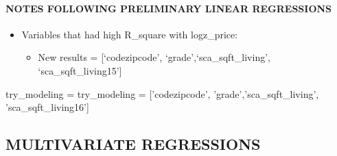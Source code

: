 \documentclass[11pt]{article}
\providecommand{\tightlist}{%
      \setlength{\itemsep}{0pt}\setlength{\parskip}{0pt}}
\newenvironment{Shaded}{}{}
\newcommand{\StringTok}[1]{\textcolor[rgb]{0.25,0.44,0.63}{{#1}}}
\newcommand{\NormalTok}[1]{{#1}}
\newcommand{\OperatorTok}[1]{\textcolor[rgb]{0.40,0.40,0.40}{{#1}}}
\begin{document}
    \hypertarget{notes-following-preliminary-linear-regressions}{%
\paragraph{NOTES FOLLOWING PRELIMINARY LINEAR
REGRESSIONS}\label{notes-following-preliminary-linear-regressions}}

\begin{itemize}
\tightlist
\item
  Variables that had high R\_square with logz\_price:

  \begin{itemize}
  \tightlist
  \item
    New results = {[}`codezipcode', `grade',`sca\_sqft\_living',
    `sca\_sqft\_living15'{]}
  \end{itemize}
\end{itemize}

\begin{Shaded}
\begin{Highlighting}[]
\NormalTok{ try_modeling }\OperatorTok{=}\NormalTok{ try_modeling }\OperatorTok{=}\NormalTok{ [}\StringTok{'codezipcode'}\NormalTok{, }\StringTok{'grade'}\NormalTok{,}\StringTok{'sca_sqft_living'}\NormalTok{, }\StringTok{'sca_sqft_living16'}\NormalTok{]}

    
\end{Highlighting}
\end{Shaded}

    \hypertarget{multivariate-regressions}{%
\subsection{MULTIVARIATE REGRESSIONS}\label{multivariate-regressions}}
\end{document}
